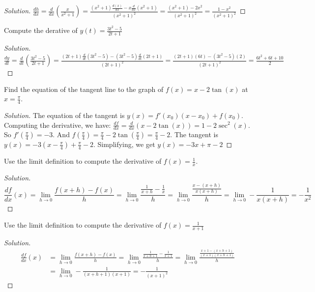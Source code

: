 \documentclass[crop=false,class=book,oneside]{standalone}
\begin{document}
\begin{proof}[Solution]
$\frac{dh}{dx}=\frac{d}{dx}(\frac{x}{x^{2}+1})=\frac{(x^{2}+1)\frac{d(x)}{dx}-x\frac{d}{dx}(x^{2}+1)}{(x^{2}+1)^{2}}=\frac{(x^{2}+1)-2x^{2}}{(x^{2}+1)^{2}}=\frac{1-x^{2}}{(x^{2}+1)^{2}}$
\end{proof}
\begin{problem}
Compute the derative of $y(t)=\frac{3t^{2}-5}{2t+1}$
\end{problem}
\begin{proof}[Solution]
$\frac{dy}{dt}=\frac{d}{dt}(\frac{3t^{2}-5}{2t+1})=\frac{(2t+1)\frac{d}{dt}(3t^{2}-5)-(3t^{2}-5)\frac{d}{dt}(2t+1)}{(2t+1)^{2}}=\frac{(2t+1)(6t)-(3t^{2}-5)(2)}{(2t+1)^{2}}=\frac{6t^{2}+6t+10}{2}$
\end{proof}
\begin{problem}
Find the equation of the tangent line to the graph of $f(x)=x-2\tan(x)$ at $x=\frac{\pi}{4}$.
\end{problem}
\begin{proof}[Solution]
The equation of the tangent is $y(x)=f'(x_{0})(x-x_{0})+f(x_{0})$. Computing the derivative, we have: $\frac{df}{dx}=\frac{d}{dx}(x-2\tan(x))=1-2\sec^{2}(x)$. So $f'(\frac{\pi}{4})=-3$. And $f(\frac{\pi}{4})=\frac{\pi}{4}-2\tan(\frac{\pi}{4})=\frac{\pi}{4}-2$. The tangent is $y(x)=-3(x-\frac{\pi}{4})+\frac{\pi}{4}-2$. Simplifying, we get $y(x)=-3x+\pi-2$
\end{proof}
\newpage
\begin{problem}
Use the limit definition to compute the derivative of $f(x)=\frac{1}{x}$.
\end{problem}
\begin{proof}[Solution]
\begin{equation*}
    \frac{df}{dx}(x)=\underset{h\rightarrow 0}{\lim}\frac{f(x+h)-f(x)}{h}=\underset{h\rightarrow 0}{\lim}\frac{\frac{1}{x+h}-\frac{1}{x}}{h}=\underset{h\rightarrow 0}{\lim}\frac{\frac{x-(x+h)}{x(x+h)}}{h}=\underset{h\rightarrow 0}{\lim}-\frac{1}{x(x+h)}=-\frac{1}{x^{2}}
\end{equation*}
\end{proof}
\begin{problem}
Use the limit definition to compute the derivative of $f(x)=\frac{1}{x+1}$
\end{problem}
\begin{proof}[Solution]
\begin{align*}
    \frac{df}{dx}(x)&=\underset{h\rightarrow 0}{\lim}\frac{f(x+h)-f(x)}{h}=\underset{h\rightarrow 0}{\lim}\frac{\frac{1}{x+h+1}-\frac{1}{x+1}}{h}=\underset{h\rightarrow 0}{\lim}\frac{\frac{x+1-(x+h+1)}{(x+1)(x+h+1)}}{h}\\
    &=\underset{h\rightarrow 0}{\lim}-\frac{1}{(x+h+1)(x+1)}=-\frac{1}{(x+1)^{2}}
\end{align*}
\end{proof}
\end{document}
